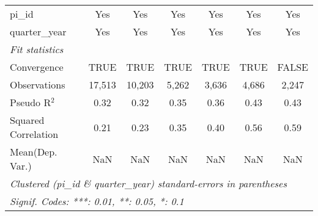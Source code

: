 \begin{tabular}{lcccccc}
   pi\_id                                                     & Yes           & Yes           & Yes           & Yes           & Yes            & Yes\\  
   quarter\_year                                              & Yes           & Yes           & Yes           & Yes           & Yes            & Yes\\  
   \midrule
   \emph{Fit statistics}\\
   Convergence                                                &TRUE           & TRUE          & TRUE          & TRUE          & TRUE           & FALSE\\  
   Observations                                               & 17,513        & 10,203        & 5,262         & 3,636         & 4,686          & 2,247\\  
   Pseudo R$^2$                                               & 0.32          & 0.32          & 0.35          & 0.36          & 0.43           & 0.43\\  
   Squared Correlation                                        & 0.21          & 0.23          & 0.35          & 0.40          & 0.56           & 0.59\\  
Mean(Dep. Var.) & NaN & NaN & NaN & NaN & NaN & NaN \\
   \midrule \midrule
   \multicolumn{7}{l}{\emph{Clustered (pi\_id \& quarter\_year) standard-errors in parentheses}}\\
   \multicolumn{7}{l}{\emph{Signif. Codes: ***: 0.01, **: 0.05, *: 0.1}}\\
\end{tabular}
\par\endgroup
